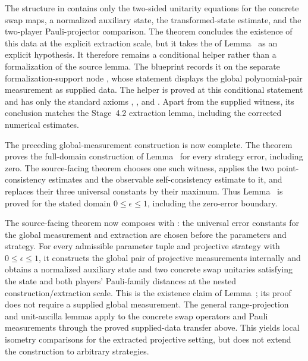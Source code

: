 \documentclass[11pt]{article}
\begin{document}
The structure  in
 contains only the two-sided
unitarity equations for the concrete swap maps, a normalized auxiliary state,
the transformed-state estimate, and the two-player Pauli-projector comparison.
The theorem  concludes the
existence of this data at the explicit extraction scale, but it takes the
 of Lemma~ as an explicit hypothesis.
It therefore remains a conditional helper rather than a formalization of the
source lemma.  The blueprint records it on the separate formalization-support
node , whose statement displays the
global polynomial-pair measurement as supplied data.  The helper is proved at
this conditional statement and has only the standard axioms ,
, and .  Apart from the supplied witness,
its conclusion matches the Stage~4.2 extraction lemma, including the corrected
numerical estimates.

The preceding global-measurement construction is now complete.
The theorem  proves the full-domain construction
of Lemma~ for every strategy error, including zero.  The
source-facing theorem  chooses one such
witness, applies the two point-consistency estimates and the observable
self-consistency estimate to it, and replaces their three universal constants
by their maximum.  Thus Lemma~ is proved for
the stated domain $0\leq\epsilon\leq1$, including the zero-error boundary.

The source-facing theorem  now composes
 with
: the universal error
constants for the global measurement and extraction are chosen before the
parameters and strategy. For every admissible parameter tuple and projective
strategy with $0\leq\epsilon\leq1$, it constructs the global pair of
projective measurements internally and obtains a normalized auxiliary state
and two concrete swap unitaries satisfying the state and both players'
Pauli-family distances at the nested construction/extraction scale. This is
the existence claim of Lemma~; its proof does not
require a supplied global measurement. The general range-projection and
unit-ancilla lemmas apply to the concrete swap operators and Pauli measurements
through the proved supplied-data transfer above. This yields local isometry
comparisons for the extracted projective setting, but does not extend the
construction to arbitrary strategies.
\end{document}
